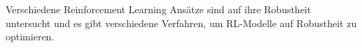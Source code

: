 Verschiedene Reinforcement Learning Ansätze sind auf ihre Robustheit untersucht und es gibt verschiedene Verfahren, um RL-Modelle auf Robustheit zu optimieren\cite{Moos.2022}.